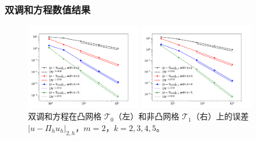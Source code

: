 \documentclass[notheorems,serif]{beamer}
\begin{document}
\begin{frame}
  \frametitle{双调和方程数值结果}
\begin{figure}[htbp]
\centering
\begin{minipage}[t]{0.49\linewidth}
\centering
\includegraphics[width=5cm]{../figures/H2_convex.pdf}
\end{minipage}%
\begin{minipage}[t]{0.49\linewidth}
\centering
\includegraphics[width=5cm]{../figures/H2_nonconvex.pdf}
\end{minipage}
\caption{双调和方程在凸网格 $\mathcal{T}_0$（左）和非凸网格 $\mathcal{T}_1$（右）上的误差 $|u - \Pi_h u_h|_{2, h}$，$m=2$，$k=2, 3, 4, 5$。}
\label{fig:H2error}
\end{figure} 
\end{frame}
\end{document}
